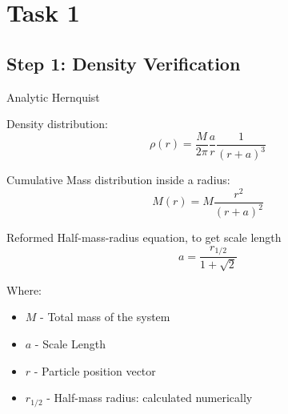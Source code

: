 \section{Task 1}
\subsection{Step 1: Density Verification}

\begin{frame}{Analytic Hernquist}

	Density distribution:
	\begin{equation}
		\rho(r) = \frac{M}{2\pi}\frac{a}{r}\frac{1}{(r+a)^3}
	\end{equation}

	Cumulative Mass distribution inside a radius:
	\begin{equation}
		M(r) = M \frac{r^2}{(r+a)^2}
		\label{eq:cumulative-mass-distribution}
	\end{equation}

	Reformed Half-mass-radius equation, to get scale length
	\begin{equation}
		a = \frac{r_{1/2}}{1+\sqrt 2}
	\end{equation}

	{\footnotesize Where:
	\begin{itemize}
		\item $M$  - Total mass of the system
		\item $a$ - Scale Length
		\item $r$ - Particle position vector
		\item $r_{1/2}$ - Half-mass radius: calculated numerically
	\end{itemize}}
\end{frame}

